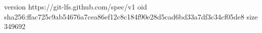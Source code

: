 version https://git-lfs.github.com/spec/v1
oid sha256:ffac725c9ab54676a7cea86ef12c8c184f90e28d5cad6bd33a7df3c34cf05de8
size 349692
